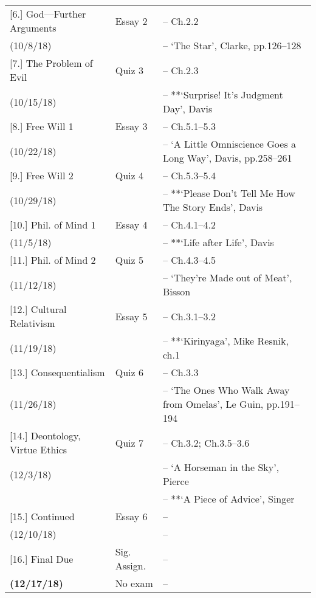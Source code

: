 \documentclass[article,oneside]{memoir}
\begin{document}
\begin{center}
\begin{longtable}{p{4.5cm}p{2cm}>{-- }p{6cm}}
[6.] God---Further Arguments	& Essay 2			&   Ch.2.2\\
(10/8/18)					&				& `The Star', Clarke, pp.126--128\\ [1.8\baselineskip]

[7.] The Problem of Evil 		& Quiz 3			& Ch.2.3\\
(10/15/18)					& 				& **`Surprise! It's Judgment Day',  Davis\\  [1.8\baselineskip]		

[8.] Free Will 1 				& Essay 3			& Ch.5.1--5.3 \\
(10/22/18)					&				&  `A Little Omniscience Goes a Long Way', Davis, pp.258--261 \\  [1.8\baselineskip]

[9.] Free Will 2 				& Quiz 4			&  Ch.5.3--5.4\\
(10/29/18)					&				& **`Please Don't Tell Me How The Story Ends', Davis \\  [1.8\baselineskip]

[10.] Phil. of Mind 1			& Essay 4				& Ch.4.1--4.2 \\
(11/5/18)					&					& **`Life after Life', Davis\\ [1.8\baselineskip]
						
[11.] Phil. of Mind 2 			& Quiz 5				& Ch.4.3--4.5 \\
(11/12/18)					&					& `They're Made out of Meat', Bisson \\ [1.8\baselineskip]
 

[12.] Cultural Relativism 		& Essay 5				& Ch.3.1--3.2\\
(11/19/18)					&					& **`Kirinyaga', Mike Resnik, ch.1 \\ [1.8\baselineskip]


[13.] Consequentialism 		& Quiz 6				&  Ch.3.3 \\ 
(11/26/18)					&					& `The Ones Who Walk Away from Omelas', Le Guin, pp.191--194 \\ [1.8\baselineskip]
						
[14.] Deontology, Virtue Ethics 	& Quiz 7				&  Ch.3.2;  Ch.3.5--3.6\\
(12/3/18)					&					&  `A Horseman in the Sky', Pierce \\ 
 				 		&					&  **`A Piece of Advice', Singer \\  [1.8\baselineskip]

[15.] Continued				& Essay 6				&  \\ 
(12/10/18)					&					& \\  [1.8\baselineskip]

[16.] Final Due			& Sig. Assign.		&  \\ 
\textbf{(12/17/18)}			& No exam	& \\  [1.8\baselineskip]



\end{longtable}
\end{center}



\end{document}
